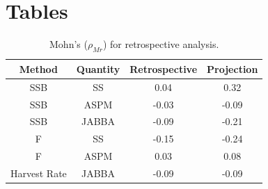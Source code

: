 \documentclass[12pt,halfline,a4paper,nonumbib]{ouparticle}
\begin{document}
\clearpage
\newpage
\printbibliography

\section{Tables}

\begin{table}[!ht]
\caption{Mohn's ($\rho_{Mr}$) for retrospective analysis.}  
\begin{center}
\label{tab:retro-rho}
\begin{tabular}{|cccc|}
\hline
	\tiny Method	& {\tiny Quantity}  & {\tiny Retrospective} & {\tiny Projection} \\ 
\hline\hline
{\tiny SSB          } & {\tiny SS} 	     & {\tiny    0.04} & {\tiny  0.32}      \\
{\tiny SSB          } & {\tiny ASPM} 	 & {\tiny   -0.03} & {\tiny -0.09}      \\
{\tiny SSB          } & {\tiny JABBA} 	 & {\tiny   -0.09} & {\tiny -0.21}      \\
{\tiny F            } & {\tiny SS} 	     & {\tiny   -0.15} & {\tiny -0.24}      \\
{\tiny F            } & {\tiny ASPM} 	 & {\tiny    0.03} & {\tiny  0.08}      \\
{\tiny Harvest Rate } & {\tiny JABBA} 	 & {\tiny   -0.09} & {\tiny -0.09}      \\
\hline
\end{tabular}
\end{center}
\end{table}
\end{document}

